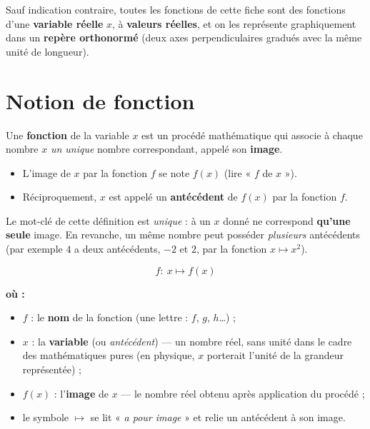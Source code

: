 \documentclass[11pt,a4paper]{article}
\newenvironment{ou}{%
  \par\smallskip\noindent\textbf{où :}\nopagebreak
  \begin{itemize}[leftmargin=1.8em,topsep=2pt,itemsep=1.5pt,parsep=0pt]}%
  {\end{itemize}}
\begin{document}
\medskip
Sauf indication contraire, toutes les fonctions de cette fiche sont des fonctions
d'une \textbf{variable réelle} $x$, à \textbf{valeurs réelles}, et on les représente
graphiquement dans un \textbf{repère orthonormé} (deux axes perpendiculaires gradués
avec la même unité de longueur).

\section{Notion de fonction}

\begin{definition}
Une \textbf{fonction} de la variable $x$ est un procédé mathématique qui associe à
chaque nombre $x$ \emph{un unique} nombre correspondant, appelé son \textbf{image}.
\begin{itemize}[leftmargin=1.5em,topsep=2pt]
  \item L'image de $x$ par la fonction $f$ se note $f(x)$ (lire « $f$ de $x$ »).
  \item Réciproquement, $x$ est appelé un \textbf{antécédent} de $f(x)$ par la fonction $f$.
\end{itemize}
\end{definition}

Le mot-clé de cette définition est \emph{unique} : à un $x$ donné ne correspond
\textbf{qu'une seule} image. En revanche, un même nombre peut posséder
\emph{plusieurs} antécédents (par exemple $4$ a deux antécédents, $-2$ et $2$, par la
fonction $x\mapsto x^2$).

\begin{formule}
\[
  f:\ x \longmapsto f(x)
\]
\begin{ou}
  \item $f$ : le \textbf{nom} de la fonction (une lettre : $f$, $g$, $h$\dots) ;
  \item $x$ : la \textbf{variable} (ou \emph{antécédent}) — un nombre réel, sans unité dans le cadre des mathématiques pures (en physique, $x$ porterait l'unité de la grandeur représentée) ;
  \item $f(x)$ : l'\textbf{image} de $x$ — le nombre réel obtenu après application du procédé ;
  \item le symbole $\longmapsto$ se lit « \emph{a pour image} » et relie un antécédent à son image.
\end{ou}
\end{formule}
\end{document}
